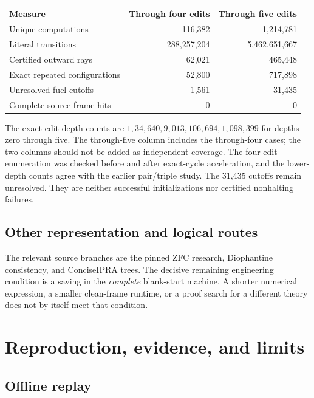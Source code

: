 \documentclass[10pt,a4paper]{article}
\begin{document}
\begin{center}
\begin{tabular}{lrr}
\toprule
Measure & Through four edits & Through five edits\\
\midrule
Unique computations & 116,382 & 1,214,781\\
Literal transitions & 288,257,204 & 5,462,651,667\\
Certified outward rays & 62,021 & 465,448\\
Exact repeated configurations & 52,800 & 717,898\\
Unresolved fuel cutoffs & 1,561 & 31,435\\
Complete source-frame hits & 0 & 0\\
\bottomrule
\end{tabular}
\end{center}

The exact edit-depth counts are
$1,34,640,9{,}013,106{,}694,1{,}098{,}399$ for depths zero through
five. The through-five column includes the through-four cases; the
two columns should not be added as independent coverage. The four-edit
enumeration was checked before and after exact-cycle acceleration,
and the lower-depth counts agree with the earlier pair/triple study.
The 31,435 cutoffs remain unresolved. They are neither successful
initializations nor certified nonhalting failures.

\subsection{Other representation and logical routes}


The relevant source branches are the pinned ZFC research, Diophantine
consistency, and ConciseIPRA trees\cite{zfc,diophantine,concise}.
The decisive remaining engineering condition is a saving in the
\emph{complete} blank-start machine. A shorter numerical expression,
a smaller clean-frame runtime, or a proof search for a different
theory does not by itself meet that condition.

\section{Reproduction, evidence, and limits}
\label{sec:reproduction}

\subsection{Offline replay}
\end{document}
